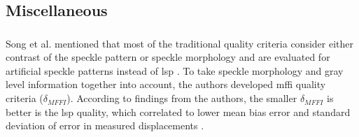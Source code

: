 

    \subsection{Miscellaneous}

    \subsubsection{}

        Song et al. mentioned that most of the traditional quality criteria consider either contrast of the speckle pattern or speckle morphology and are evaluated for artificial speckle patterns instead of \gls{lsp} \cite{song}. To take speckle morphology and gray level information together into account, the authors developed \gls{mffi} quality criteria ($\delta_{MFFI}$). According to findings from the authors, the smaller $\delta_{MFFI}$ is better is the \gls{lsp} quality, which correlated to lower mean bias error and standard deviation of error in measured displacements \cite{song}.
        
            
                
                
